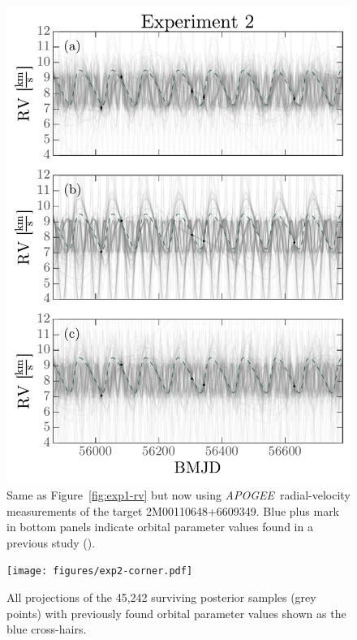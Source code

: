 \documentclass[manuscript, letterpaper]{aastex6}
\newcommand{\project}[1]{\textsl{#1}}
\newcommand{\acronym}[1]{{\small{#1}}}
\newcommand{\apogee}{\project{\acronym{APOGEE}}}
\newcommand{\figname}{Figure}
\begin{document}
\begin{figure}[p]
\begin{center}
\includegraphics[width=\textwidth]{figures/exp2-rv-curves.pdf}
\end{center}
\caption{%
Same as \figname~\ref{fig:exp1-rv} but now using \apogee\ radial-velocity
measurements of the target 2M00110648+6609349.
Blue plus mark in bottom panels indicate orbital parameter values found in a
previous study (\citealt{Troup:2016}).
\label{fig:exp2-rv}}
\end{figure}

\begin{figure}[p]
\begin{center}
\texttt{[image: figures/exp2-corner.pdf]}
\end{center}
\caption{%
All projections of the 45,242 surviving posterior samples (grey points) with
previously found orbital parameter values shown as the blue cross-hairs.
\label{fig:exp2-corner}}
\end{figure}
\end{document}
